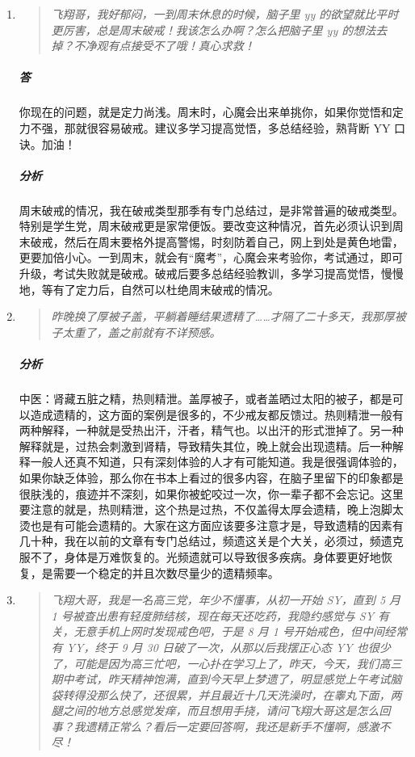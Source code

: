 \documentclass{ctexart}
\begin{document}
\begin{enumerate}
    \item \begin{quote}\it
        飞翔哥，我好郁闷，一到周末休息的时候，脑子里 yy 的欲望就比平时更厉害，总是周末破戒！我该怎么办啊？怎么把脑子里 yy 的想法去掉？不净观有点接受不了哦！真心求救！
    \end{quote}
    \subparagraph{答} 你现在的问题，就是定力尚浅。周末时，心魔会出来单挑你，如果你觉悟和定力不强，那就很容易破戒。建议多学习提高觉悟，多总结经验，熟背断 YY 口诀。加油！
    \subparagraph{分析} 周末破戒的情况，我在破戒类型那季有专门总结过，是非常普遍的破戒类型。特别是学生党，周末破戒更是家常便饭。要改变这种情况，首先必须认识到周末破戒，然后在周末要格外提高警惕，时刻防着自己，网上到处是黄色地雷，更要加倍小心。一到周末，就会有“魔考”，心魔会来考验你，考试通过，即可升级，考试失败就是破戒。破戒后要多总结经验教训，多学习提高觉悟，慢慢地，等有了定力后，自然可以杜绝周末破戒的情况。
    \item \begin{quote}\it
        昨晚换了厚被子盖，平躺着睡结果遗精了……才隔了二十多天，我那厚被子太重了，盖之前就有不详预感。
    \end{quote}
    \subparagraph{分析} 中医：肾藏五脏之精，热则精泄。盖厚被子，或者盖晒过太阳的被子，都是可以造成遗精的，这方面的案例是很多的，不少戒友都反馈过。热则精泄一般有两种解释，一种就是受热出汗，汗者，精气也。以出汗的形式泄掉了。另一种解释就是，过热会刺激到肾精，导致精失其位，晚上就会出现遗精。后一种解释一般人还真不知道，只有深刻体验的人才有可能知道。我是很强调体验的，如果你缺乏体验，那么你在书本上看过的很多内容，在脑子里留下的印象都是很肤浅的，痕迹并不深刻，如果你被蛇咬过一次，你一辈子都不会忘记。这里要注意的就是，热则精泄，这个热是过热，不仅盖得太厚会遗精，晚上泡脚太烫也是有可能会遗精的。大家在这方面应该要多注意才是，导致遗精的因素有几十种，我在以前的文章有专门总结过，频遗这关是个大关，必须过，频遗克服不了，身体是万难恢复的。光频遗就可以导致很多疾病。身体要更好地恢复，是需要一个稳定的并且次数尽量少的遗精频率。
    \item \begin{quote}\it
        飞翔大哥，我是一名高三党，年少不懂事，从初一开始 SY，直到 5 月 1 号被查出患有轻度肺结核，现在每天还吃药，我隐约感觉与 SY 有关，无意手机上网时发现戒色吧，于是 8 月 1 号开始戒色，但中间经常有 YY，终于 9 月 30 日破了一次，从那以后我摆正心态 YY 也很少了，可能是因为高三忙吧，一心扑在学习上了，昨天，今天，我们高三期中考试，昨天精神饱满，直到今天早上梦遗了，明显感觉上午考试脑袋转得没那么快了，还很累，并且最近十几天洗澡时，在睾丸下面，两腿之间的地方总感觉发痒，而且想用手挠，请问飞翔大哥这是怎么回事？我遗精正常么？看后一定要回答啊，我还是新手不懂啊，感激不尽！

\end{quote}
\end{enumerate}
\end{document}
